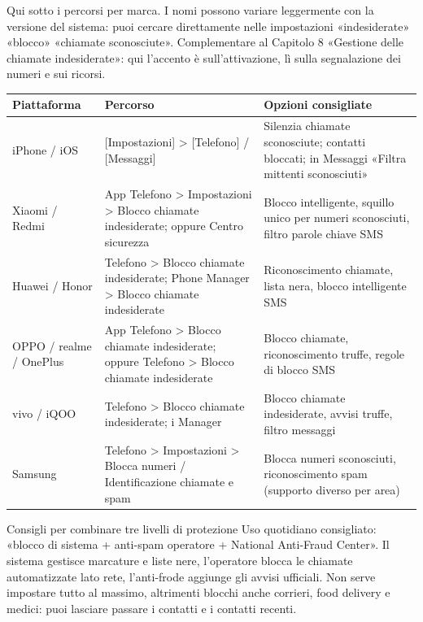 
Qui sotto i percorsi per marca. I nomi possono variare leggermente con la versione del sistema: puoi cercare direttamente nelle impostazioni «indesiderate» «blocco» «chiamate sconosciute». Complementare al Capitolo 8 «Gestione delle chiamate indesiderate»: qui l'accento è sull'attivazione, lì sulla segnalazione dei numeri e sui ricorsi.

\begin{center}
\begin{tabularx}{\linewidth}{|X|X|X|}
\hline
\textbf{Piattaforma} & \textbf{Percorso} & \textbf{Opzioni consigliate} \tabularnewline
\hline
iPhone / iOS & {}[Impostazioni] > [Telefono] / [Messaggi] & Silenzia chiamate sconosciute; contatti bloccati; in Messaggi «Filtra mittenti sconosciuti» \tabularnewline
Xiaomi / Redmi & App Telefono > Impostazioni > Blocco chiamate indesiderate; oppure Centro sicurezza & Blocco intelligente, squillo unico per numeri sconosciuti, filtro parole chiave SMS \tabularnewline
Huawei / Honor & Telefono > Blocco chiamate indesiderate; Phone Manager > Blocco chiamate indesiderate & Riconoscimento chiamate, lista nera, blocco intelligente SMS \tabularnewline
OPPO / realme / OnePlus & App Telefono > Blocco chiamate indesiderate; oppure Telefono > Blocco chiamate indesiderate & Blocco chiamate, riconoscimento truffe, regole di blocco SMS \tabularnewline
vivo / iQOO & Telefono > Blocco chiamate indesiderate; i Manager & Blocco chiamate indesiderate, avvisi truffe, filtro messaggi \tabularnewline
Samsung & Telefono > Impostazioni > Blocca numeri / Identificazione chiamate e spam & Blocca numeri sconosciuti, riconoscimento spam (supporto diverso per area) \tabularnewline
\hline
\end{tabularx}
\end{center}

\begin{tcbinfo}{Consigli per combinare tre livelli di protezione}
Uso quotidiano consigliato: «blocco di sistema + anti-spam operatore + National Anti-Fraud Center». Il sistema gestisce marcature e liste nere, l'operatore blocca le chiamate automatizzate lato rete, l'anti-frode aggiunge gli avvisi ufficiali. Non serve impostare tutto al massimo, altrimenti blocchi anche corrieri, food delivery e medici: puoi lasciare passare i contatti e i contatti recenti.

\end{tcbinfo}

